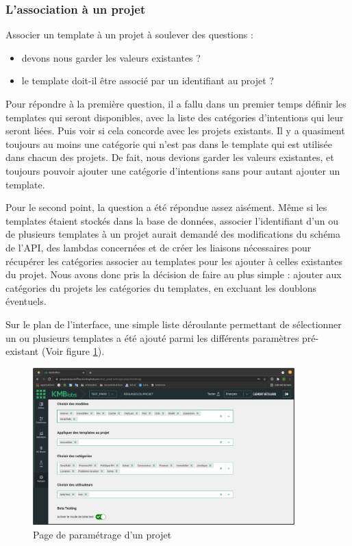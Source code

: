 \documentclass[12pt,a4paper,oneside]{scrreprt}
\begin{document}
\subsubsection{L'association à un projet}

Associer un template à un projet à soulever des questions :
\begin{itemize}
	\item devons nous garder les valeurs existantes ?
	\item le template doit-il être associé par un identifiant au projet ?
\end{itemize}

Pour répondre à la première question, il a fallu dans un premier temps définir les templates qui seront disponibles, avec la liste des catégories d'intentions qui leur seront liées. Puis voir si cela concorde avec les projets existants. Il y a quasiment toujours au moins une catégorie qui n'est pas dans le template qui est utilisée dans chacun des projets. De fait, nous devions garder les valeurs existantes, et toujours pouvoir ajouter une catégorie d'intentions sans pour autant ajouter un template.

Pour le second point, la question a été répondue assez aisément. Même si les templates étaient stockés dans la base de données, associer l'identifiant d'un ou de plusieurs templates à un projet aurait demandé des modifications du schéma de l'API, des lambdas concernées et de créer les liaisons nécessaires pour récupérer les catégories associer au templates pour les ajouter à celles existantes du projet. Nous avons donc pris la décision de faire au plus simple : ajouter aux catégories du projets les catégories du templates, en excluant les doublons éventuels.

Sur le plan de l'interface, une simple liste déroulante permettant de sélectionner un ou plusieurs templates a été ajouté parmi les différents paramètres pré-existant (Voir figure \ref{fig:parameters}).

\begin{figure}[!ht]
	\centering
	\includegraphics[width=0.9\textwidth]{pictures/template_selector.png}
	\caption{Page de paramétrage d'un projet}
	\label{fig:parameters}
\end{figure}
\end{document}
